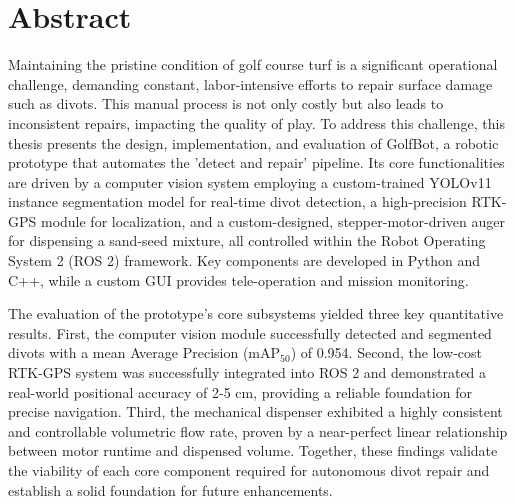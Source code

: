 
\chapter*{Abstract}

Maintaining the pristine condition of golf course turf is a significant operational challenge, demanding constant, labor-intensive efforts to repair surface damage such as divots. This manual process is not only costly but also leads to inconsistent repairs, impacting the quality of play. To address this challenge, this thesis presents the design, implementation, and evaluation of GolfBot, a robotic prototype that automates the 'detect and repair' pipeline. Its core functionalities are driven by a computer vision system employing a custom-trained YOLOv11 instance segmentation model for real-time divot detection, a high-precision RTK-GPS module for localization, and a custom-designed, stepper-motor-driven auger for dispensing a sand-seed mixture, all controlled within the Robot Operating System 2 (ROS 2) framework. Key components are developed in Python and C++, while a custom GUI provides tele-operation and mission monitoring.

The evaluation of the prototype's core subsystems yielded three key quantitative results. First, the computer vision module successfully detected and segmented divots with a mean Average Precision (mAP$_{50}$) of 0.954. Second, the low-cost RTK-GPS system was successfully integrated into ROS 2 and demonstrated a real-world positional accuracy of 2-5 cm, providing a reliable foundation for precise navigation. Third, the mechanical dispenser exhibited a highly consistent and controllable volumetric flow rate, proven by a near-perfect linear relationship between motor runtime and dispensed volume. Together, these findings validate the viability of each core component required for autonomous divot repair and establish a solid foundation for future enhancements.

    
